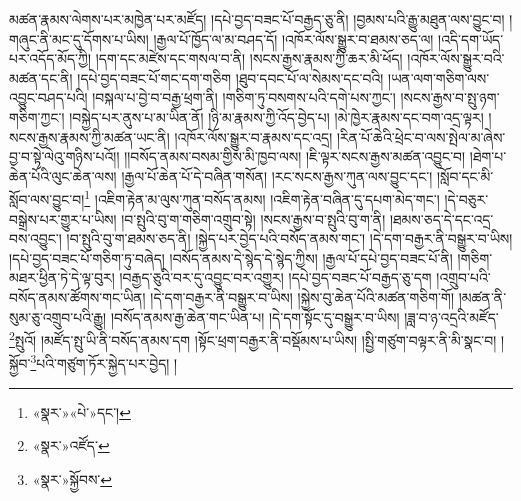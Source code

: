 \documentclass[12pt,a4paper]{book}
\begin{document}
མཚན་རྣམས་ལེགས་པར་མཁྱེན་པར་མཛོད། །དཔེ་བྱད་བཟང་པོ་བརྒྱད་ཅུ་ནི། །བྱམས་པའི་རྒྱུ་མཐུན་ལས་བྱུང་བ། །གཞུང་ནི་མང་དུ་དོགས་པ་ཡིས། །རྒྱལ་པོ་ཁྱོད་ལ་མ་བཤད་དོ། །འཁོར་ལོས་སྒྱུར་བ་ཐམས་ཅད་ལ། །འདི་དག་ཡོད་པར་འདོད་མོད་ཀྱི། །དག་དང་མཛེས་དང་གསལ་བ་ནི། །སངས་རྒྱས་རྣམས་ཀྱི་ཆར་མི་ཕོད། །འཁོར་ལོས་སྒྱུར་བའི་མཚན་དང་ནི། །དཔེ་བྱད་བཟང་པོ་གང་དག་གཅིག །ཐུབ་དབང་པོ་ལ་སེམས་དང་བའི། །ཡན་ལག་གཅིག་ལས་འབྱུང་བཤད་པའི། །བསྐལ་པ་བྱེ་བ་བརྒྱ་ཕྲག་ནི། །གཅིག་ཏུ་བསགས་པའི་དགེ་པས་ཀྱང་། །སངས་རྒྱས་བ་སྤུ་ཉག་གཅིག་ཀྱང་། །བསྐྱེད་པར་ནུས་པ་མ་ཡིན་ནོ། །ཉི་མ་རྣམས་ཀྱི་འོད་བྱེད་པ། །མེ་ཁྱེར་རྣམས་དང་བག་འདྲ་ལྟར། །སངས་རྒྱས་རྣམས་ཀྱི་མཚན་ཡང་ནི། །འཁོར་ལོས་སྒྱུར་བ་རྣམས་དང་འདྲ། །རིན་པོ་ཆེའི་ཕྲེང་བ་ལས་སྤེལ་མ་ཞེས་བྱ་བ་སྟེ་ལེའུ་གཉིས་པའོ།། །།བསོད་ནམས་བསམ་གྱིས་མི་ཁྱབ་ལས། །ཇི་ལྟར་སངས་རྒྱས་མཚན་འབྱུང་བ། །ཐེག་པ་ཆེན་པོའི་ལུང་ཆེན་ལས། །རྒྱལ་པོ་ཆེན་པོ་དེ་བཞིན་གསོན། །རང་སངས་རྒྱས་ཀུན་ལས་བྱུང་དང་། །སློབ་དང་མི་སློབ་ལས་བྱུང་བ།\footnote{«སྣར་»«པེ་»དང་།} །འཇིག་རྟེན་མ་ལུས་ཀུན་བསོད་ནམས། །འཇིག་རྟེན་བཞིན་དུ་དཔག་མེད་གང་། །དེ་བཅུར་བསྒྲེས་པར་གྱུར་པ་ཡིས། །བ་སྤུའི་བུ་ག་གཅིག་འགྲུབ་སྟེ། །སངས་རྒྱས་བ་སྤུའི་བུ་ག་ནི། །ཐམས་ཅད་དེ་དང་འདྲ་བས་འབྱུང་། །བ་སྤུའི་བུ་ག་ཐམས་ཅད་ནི། །སྐྱེད་པར་བྱེད་པའི་བསོད་ནམས་གང་། །དེ་དག་བརྒྱར་ནི་བསྒྱུར་བ་ཡིས། །དཔེ་བྱད་བཟང་པོ་གཅིག་ཏུ་བཞེད། །བསོད་ནམས་དེ་སྙེད་དེ་སྙེད་ཀྱིས། །རྒྱལ་པོ་དཔེ་བྱད་བཟང་པོ་ནི། །གཅིག་མཐར་ཕྱིན་ཏེ་དེ་ལྟ་བུར། །བརྒྱད་ཅུའི་བར་དུ་འབྱུང་བར་འགྱུར། །དཔེ་བྱད་བཟང་པོ་བརྒྱད་ཅུ་དག །འགྲུབ་པའི་བསོད་ནམས་ཚོགས་གང་ཡིན། །དེ་དག་བརྒྱར་ནི་བསྒྱུར་བ་ཡིས། །སྐྱེས་བུ་ཆེན་པོའི་མཚན་གཅིག་གོ། །མཚན་ནི་སུམ་ཅུ་འགྲུབ་པའི་རྒྱུ། །བསོད་ནམས་རྒྱ་ཆེན་གང་ཡིན་པ། །དེ་དག་སྟོང་དུ་བསྒྱུར་བ་ཡིས། །ཟླ་བ་ཉ་འདྲའི་མཛོད་\footnote{«སྣར་»འཛོད་}སྤུའོ། །མཛོད་སྤུ་ཡི་ནི་བསོད་ནམས་དག །སྟོང་ཕྲག་བརྒྱར་ནི་བསྡོམས་པ་ཡིས། །སྤྱི་གཙུག་བལྟར་ནི་མི་སྣང་བ། །སྐྱོབ་\footnote{«སྣར་»སྐྱོབས་}པའི་གཙུག་ཏོར་སྐྱེད་པར་བྱེད། །
\end{document}
